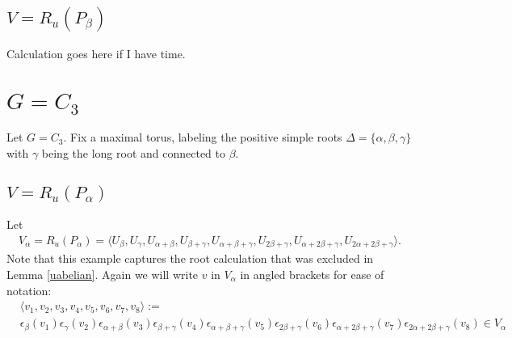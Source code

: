\subsection{$V = R_u(P_\beta)$}
\label{g2:beta}
Calculation goes here if I have time.

\section{$G = C_3$}
\label{c3}
Let $G=C_3$. Fix a maximal torus, labeling the positive simple roots $\Delta=\{\alpha, \beta, \gamma\}$ with $\gamma$ being the long root and connected to $\beta$. 

\subsection{$V = R_u(P_\alpha)$}
\label{c3:alpha}

Let 
\begin{align}
V_\alpha = R_u(P_\alpha) = \langle U_\beta, U_\gamma, U_{\alpha+\beta}, U_{\beta+\gamma}, U_{\alpha+\beta+\gamma}, U_{2\beta+\gamma}, U_{\alpha+2\beta+\gamma}, U_{2\alpha+2\beta+\gamma}\rangle.
\end{align}
Note that this example captures the root calculation that was excluded in Lemma \ref{uabelian}.
Again we will write $v$ in $V_\alpha$ in angled brackets for ease of notation:
\begin{align*}
&\langle 
v_1,
v_2,
v_3,
v_4,
v_5,
v_6,
v_7,
v_8
\rangle :=\\
&\epsilon_{\beta}(v_1)
\epsilon_{\gamma}(v_2)
\epsilon_{\alpha+\beta}(v_3)
\epsilon_{\beta+\gamma}(v_4)
\epsilon_{\alpha+\beta+\gamma}(v_5)
\epsilon_{2\beta+\gamma}(v_6)
\epsilon_{\alpha+2\beta+\gamma}(v_7)
\epsilon_{2\alpha+2\beta+\gamma}(v_8) \in V_\alpha
\end{align*}


